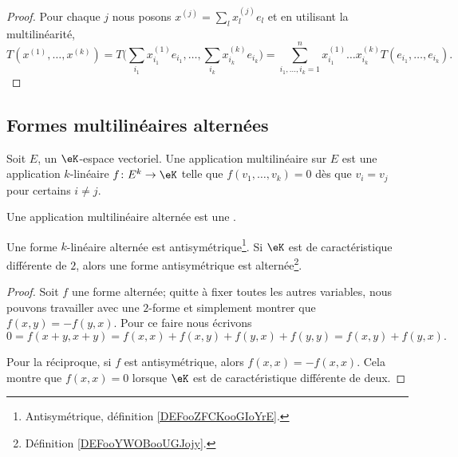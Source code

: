 \begin{proof}
	Pour chaque \( j\) nous posons \( x^{(j)}=\sum_lx^{(j)}_le_l\) et en utilisant la multilinéarité,
	\begin{equation}
		T(x^{(1)},\ldots,x^{(k)})=T\big( \sum_{i_1}x_{i_1}^{(1)}e_{i_1},\ldots,\sum_{i_k}x_{i_k}^{(k)}e_{i_k} \big)=\sum_{i_1,\ldots,i_k=1}^nx_{i_1}^{(1)}\ldots x_{i_k}^{(k)}T(e_{i_1},\ldots,e_{i_k}).
	\end{equation}
\end{proof}



\subsection{Formes multilinéaires alternées}


\begin{definition}       \label{DEFooYWOBooUGJojy}
	Soit \( E\), un \( \eK\)-espace vectoriel. Une application multilinéaire  sur \( E\) est une application \( k\)-linéaire \( f\colon E^k\to \eK\) telle que \( f(v_1,\ldots, v_k)=0\) dès que \( v_i=v_j\) pour certains \( i\neq j\).

	Une application multilinéaire alternée est une .
\end{definition}


\begin{lemma}   \label{LemHiHNey}
	Une forme \( k\)-linéaire alternée est antisymétrique\footnote{Antisymétrique, définition \ref{DEFooZFCKooGIoYrE}.}. Si \( \eK\) est de caractéristique différente de \( 2\), alors une forme antisymétrique est alternée\footnote{Définition \ref{DEFooYWOBooUGJojy}.}.
\end{lemma}

\begin{proof}
	Soit \( f\) une forme alternée; quitte à fixer toutes les autres variables, nous pouvons travailler avec une \( 2\)-forme et simplement montrer que \( f(x,y)=-f(y,x)\). Pour ce faire nous écrivons
	\begin{equation}
		0=f(x+y,x+y)=f(x,x)+f(x,y)+f(y,x)+f(y,y)=f(x,y)+f(y,x).
	\end{equation}

	Pour la réciproque, si \( f\) est antisymétrique, alors \( f(x,x)=-f(x,x)\). Cela montre que \( f(x,x)=0\) lorsque \( \eK\) est de caractéristique différente de deux.
\end{proof}


